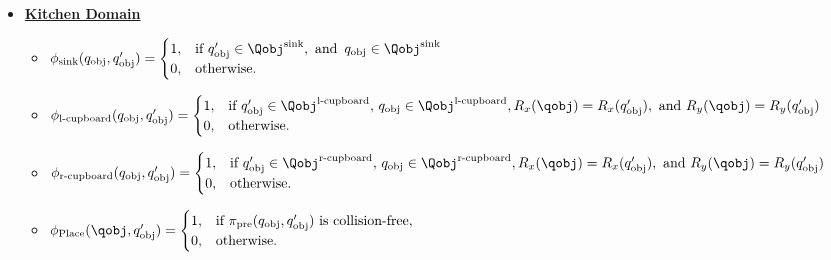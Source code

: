 \begin{itemize}
\begin{itemize}
        \item[] \underline{\textbf{Kitchen Domain}}
            \begin{itemize}
                \item \(\phi_\text{sink}(q_\text{obj}, q'_\text{obj}) = 
                \begin{cases} 
                1, & \text{if } q'_\text{obj} \in \Qobj^\text{sink}, \text{ and } \, q_\text{obj} \in \Qobj^\text{sink} \\ 
                0, & \text{otherwise.} 
                \end{cases}\)
                \item \(\phi_\text{l-cupboard}(q_\text{obj}, q'_\text{obj}) = 
                \begin{cases} 
                1, & \text{if } q'_\text{obj} \in \Qobj^\text{l-cupboard}, \, q_\text{obj} \in \Qobj^\text{l-cupboard}, R_x(\qobj)=R_x(q'_\text{obj}), \text{ and } R_y(\qobj)=R_y(q'_\text{obj})\\ 
                0, & \text{otherwise.} 
                \end{cases}\)
                \item \(\phi_\text{r-cupboard}(q_\text{obj}, q'_\text{obj}) = 
                \begin{cases} 
                1, & \text{if } q'_\text{obj} \in \Qobj^\text{r-cupboard}, \, q_\text{obj} \in \Qobj^\text{r-cupboard}, R_x(\qobj)=R_x(q'_\text{obj}), \text{ and } R_y(\qobj)=R_y(q'_\text{obj})\\ 
                0, & \text{otherwise.} 
                \end{cases}\)
                \item \(\phi_\text{Place}(\qobj, q'_\text{obj}) = 
                \begin{cases} 
                1, & \text{if } \pi_\text{pre}(q_\text{obj}, q'_\text{obj}) \text{ is collision-free}, \\ 
                0, & \text{otherwise.} 
                \end{cases}\)
            \end{itemize}

    \end{itemize}

\end{itemize}

\noindent\hrulefill
